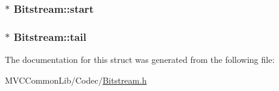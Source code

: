 \label{struct_bitstream_ac7479c4c4e57d10bbfdd90baf6e731a4}
\hypertarget{struct_bitstream_a4c2cb09a4fee7ed90d05f8b40914911e}{
\subsubsection[{start}]{$\ast$ {\bf Bitstream::start}}}
\label{struct_bitstream_a4c2cb09a4fee7ed90d05f8b40914911e}
\hypertarget{struct_bitstream_addd740548c260796cf01e55597f749c6}{
\subsubsection[{tail}]{$\ast$ {\bf Bitstream::tail}}}
\label{struct_bitstream_addd740548c260796cf01e55597f749c6}


The documentation for this struct was generated from the following file:\begin{DoxyCompactItemize}
\item 
MVCCommonLib/Codec/\hyperlink{_bitstream_8h}{Bitstream.h}\end{DoxyCompactItemize}
